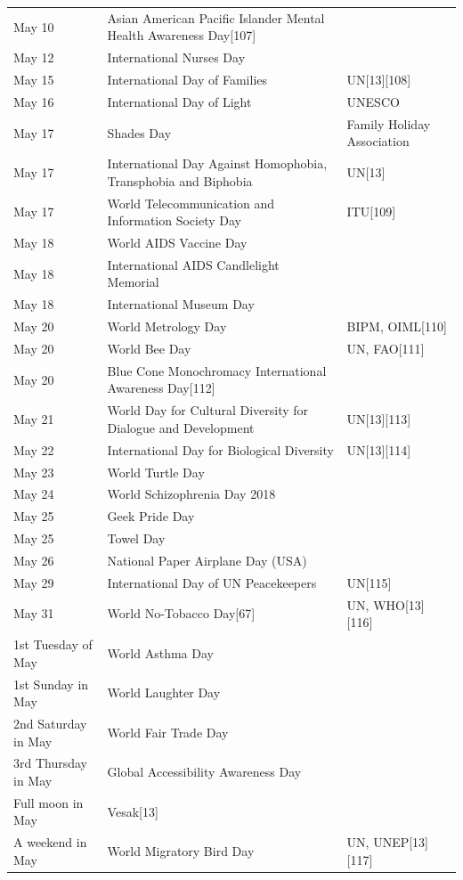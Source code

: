\documentclass[
  openany]{book}
\begin{document}
\begin{longtable}[t]{>{\raggedright\arraybackslash}p{8em}>{\raggedright\arraybackslash}p{20em}>{\raggedright\arraybackslash}p{12em}}
May 10 & Asian American Pacific Islander Mental Health Awareness Day[107] & \\
\addlinespace
May 12 & International Nurses Day & \\
May 15 & International Day of Families & UN[13][108]\\
May 16 & International Day of Light & UNESCO\\
May 17 & Shades Day & Family Holiday Association\\
May 17 & International Day Against Homophobia, Transphobia and Biphobia & UN[13]\\
\addlinespace
May 17 & World Telecommunication and Information Society Day & ITU[109]\\
May 18 & World AIDS Vaccine Day & \\
May 18 & International AIDS Candlelight Memorial & \\
May 18 & International Museum Day & \\
May 20 & World Metrology Day & BIPM, OIML[110]\\
\addlinespace
May 20 & World Bee Day & UN, FAO[111]\\
May 20 & Blue Cone Monochromacy International Awareness Day[112] & \\
May 21 & World Day for Cultural Diversity for Dialogue and Development & UN[13][113]\\
May 22 & International Day for Biological Diversity & UN[13][114]\\
May 23 & World Turtle Day & \\
\addlinespace
May 24 & World Schizophrenia Day 2018 & \\
May 25 & Geek Pride Day & \\
May 25 & Towel Day & \\
May 26 & National Paper Airplane Day (USA) & \\
May 29 & International Day of UN Peacekeepers & UN[115]\\
\addlinespace
May 31 & World No-Tobacco Day[67] & UN, WHO[13][116]\\
1st Tuesday of May & World Asthma Day & \\
1st Sunday in May & World Laughter Day & \\
2nd Saturday in May & World Fair Trade Day & \\
3rd Thursday in May & Global Accessibility Awareness Day & \\
\addlinespace
Full moon in May & Vesak[13] & \\
A weekend in May & World Migratory Bird Day & UN, UNEP[13][117]\\

\end{longtable}
\end{document}
